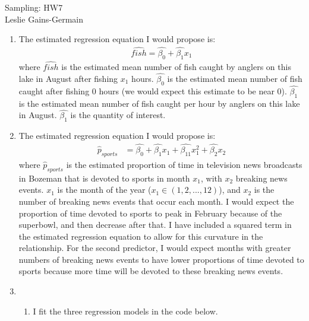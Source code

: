 \documentclass[12pt]{article}\usepackage[]{graphicx}\usepackage[]{color}
\begin{document}
  
  
  \begin{center}
\large{Sampling: HW7} \\
Leslie Gains-Germain
\end{center}

\begin{doublespacing}

\begin{enumerate}

\item The estimated regression equation I would propose is:
\begin{align*}
\hat{fish} = \hat{\beta_0} + \hat{\beta_1}x_1
\end{align*}
where $\hat{fish}$ is the estimated mean number of fish caught by anglers on this lake in August after fishing $x_1$ hours. $\hat{\beta_0}$ is the estimated mean number of fish caught after fishing $0$ hours (we would expect this estimate to be near $0$). $\hat{\beta_1}$ is the estimated mean number of fish caught per hour by anglers on this lake in August. $\hat{\beta_1}$ is the quantity of interest.

\item The estimated regression equation I would propose is:
\begin{align*}
\hat{p}_{sports} &= \hat{\beta_0} + \hat{\beta_1}x_1 + \hat{\beta_{11}}x_1^2 + \hat{\beta_2}x_2
\end{align*}
where $\hat{p}_{sports}$ is the estimated proportion of time in television news broadcasts in Bozeman that is devoted to sports in month $x_1$, with $x_2$ breaking news events. $x_1$ is the month of the year ($x_1 \in (1, 2,..., 12)$), and $x_2$ is the number of breaking news events that occur each month. I would expect the proportion of time devoted to sports to peak in February because of the superbowl, and then decrease after that. I have included a squared term in the estimated regression equation to allow for this curvature in the relationship. For the second predictor, I would expect months with greater numbers of breaking news events to have lower proportions of time devoted to sports because more time will be devoted to these breaking news events.




\item \begin{enumerate}

\item I fit the three regression models in the code below.


\end{enumerate}
\end{enumerate}
\end{doublespacing}
\end{document}

